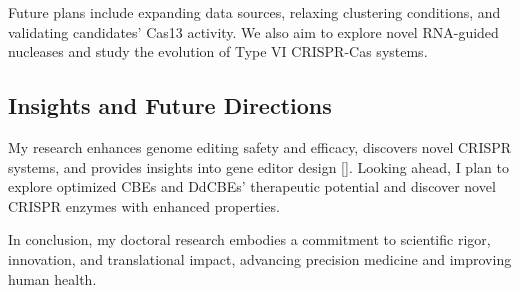 \documentclass[12pt]{article}
\begin{document}
Future plans include expanding data sources, relaxing clustering conditions, and validating candidates' Cas13 activity. We also aim to explore novel RNA-guided nucleases and study the evolution of Type VI CRISPR-Cas systems.  

\subsection*{Insights and Future Directions}




My research enhances genome editing safety and efficacy, discovers novel CRISPR systems, and provides insights into gene editor design [\cite{lei2021, lei2022, hu2022}]. Looking ahead, I plan to explore optimized CBEs and DdCBEs' therapeutic potential and discover novel CRISPR enzymes with enhanced properties.  
  
In conclusion, my doctoral research embodies a commitment to scientific rigor, innovation, and translational impact, advancing precision medicine and improving human health.  
  


\end{document}
